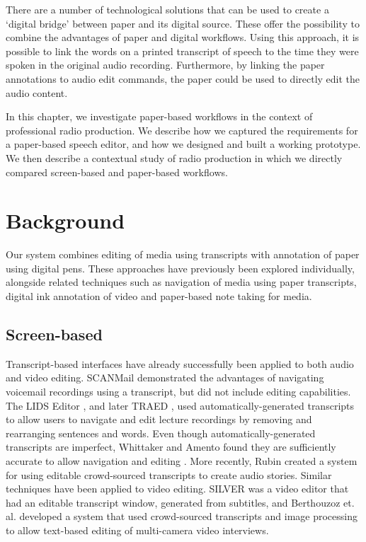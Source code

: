 There are a number of technological solutions that can be used to create a `digital bridge' between paper and
its digital source. These offer the possibility to combine the advantages of paper and digital workflows. Using this
approach, it is possible to link the words on a printed transcript of speech to the time they were spoken in the
original audio recording. Furthermore, by linking the paper annotations to audio edit commands, the paper could be used
to directly edit the audio content.

In this chapter, we investigate paper-based workflows in the context of professional radio production. We describe how
we captured the requirements for a paper-based speech editor, and how we designed and built a working prototype. We
then describe a contextual study of radio production in which we directly compared screen-based and paper-based
workflows. 

\section{Background}\label{sec:paper-background}
Our system combines editing of media using transcripts with annotation of paper using digital pens. These approaches
have previously been explored individually, alongside related techniques such as navigation of media using paper
transcripts, digital ink annotation of video and paper-based note taking for media.

\subsection{Screen-based}
Transcript-based interfaces have already successfully been applied to both audio and video editing. SCANMail
\citep{Whittaker2002} demonstrated the advantages of navigating voicemail recordings using a transcript, but did not
include editing capabilities.  The LIDS Editor \citep{Apperley2002}, and later TRAED \citep{Masoodian2006}, used
automatically-generated transcripts to allow users to navigate and edit lecture recordings by removing and rearranging
sentences and words. Even though automatically-generated transcripts are imperfect, Whittaker and Amento found they are
sufficiently accurate to allow navigation and editing \citep{Whittaker2004}.  More recently, Rubin \citep{Rubin2013}
created a system for using editable crowd-sourced transcripts to create audio stories.  Similar techniques have been
applied to video editing. SILVER \citep{Casares2002} was a video editor that had an editable transcript window,
generated from subtitles, and Berthouzoz et. al.  \citep{Berthouzoz2012} developed a system that used crowd-sourced
transcripts and image processing to allow text-based editing of multi-camera video interviews.

